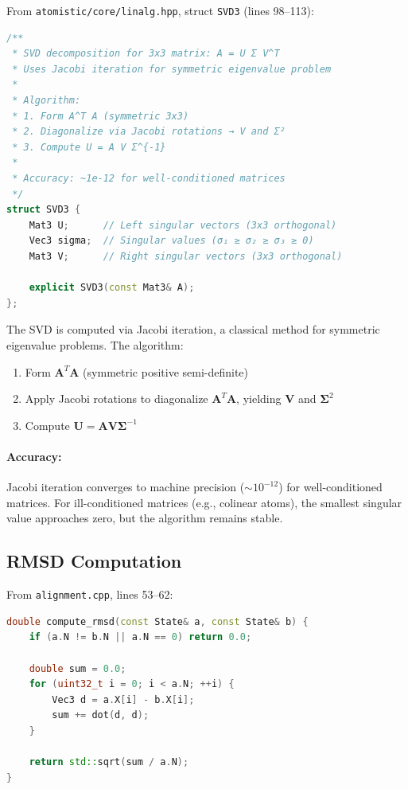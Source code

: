 \documentclass[11pt]{article}
\begin{document}
From \texttt{atomistic/core/linalg.hpp}, struct \texttt{SVD3} (lines 98--113):

\begin{lstlisting}[language=C++]
/**
 * SVD decomposition for 3x3 matrix: A = U Σ V^T
 * Uses Jacobi iteration for symmetric eigenvalue problem
 * 
 * Algorithm:
 * 1. Form A^T A (symmetric 3x3)
 * 2. Diagonalize via Jacobi rotations → V and Σ²
 * 3. Compute U = A V Σ^{-1}
 * 
 * Accuracy: ~1e-12 for well-conditioned matrices
 */
struct SVD3 {
    Mat3 U;      // Left singular vectors (3x3 orthogonal)
    Vec3 sigma;  // Singular values (σ₁ ≥ σ₂ ≥ σ₃ ≥ 0)
    Mat3 V;      // Right singular vectors (3x3 orthogonal)
    
    explicit SVD3(const Mat3& A);
};
\end{lstlisting}

The SVD is computed via Jacobi iteration, a classical method for symmetric eigenvalue problems. The algorithm:

\begin{enumerate}
\item Form $\mathbf{A}^T\mathbf{A}$ (symmetric positive semi-definite)
\item Apply Jacobi rotations to diagonalize $\mathbf{A}^T\mathbf{A}$, yielding $\mathbf{V}$ and $\boldsymbol{\Sigma}^2$
\item Compute $\mathbf{U} = \mathbf{A}\mathbf{V}\boldsymbol{\Sigma}^{-1}$
\end{enumerate}

\paragraph{Accuracy:} Jacobi iteration converges to machine precision ($\sim 10^{-12}$) for well-conditioned matrices. For ill-conditioned matrices (e.g., colinear atoms), the smallest singular value approaches zero, but the algorithm remains stable.

\subsection{RMSD Computation}

From \texttt{alignment.cpp}, lines 53--62:

\begin{lstlisting}[language=C++]
double compute_rmsd(const State& a, const State& b) {
    if (a.N != b.N || a.N == 0) return 0.0;
    
    double sum = 0.0;
    for (uint32_t i = 0; i < a.N; ++i) {
        Vec3 d = a.X[i] - b.X[i];
        sum += dot(d, d);
    }
    
    return std::sqrt(sum / a.N);
}
\end{lstlisting}
\end{document}
